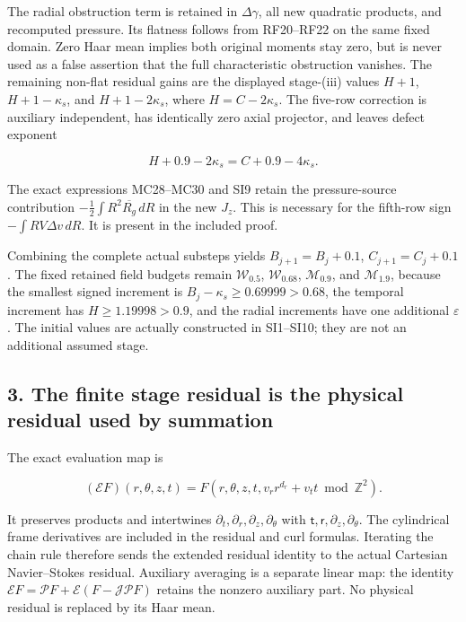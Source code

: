 \documentclass[10pt,a4paper]{article}
\begin{document}
The radial obstruction term is retained in \(\Delta\gamma\), all new quadratic products, and recomputed pressure. Its flatness follows from RF20--RF22 on the same fixed domain. Zero Haar mean implies both original moments stay zero, but is never used as a false assertion that the full characteristic obstruction vanishes. The remaining non-flat residual gains are the displayed stage-(iii) values \(H+1\), \(H+1-\kappa_s\), and \(H+1-2\kappa_s\), where \(H=C-2\kappa_s\). The five-row correction is auxiliary independent, has identically zero axial projector, and leaves defect exponent

\[
H+0.9-2\kappa_s=C+0.9-4\kappa_s.
\]

The exact expressions MC28--MC30 and SI9 retain the pressure-source contribution \(-\tfrac12\int R^2\overline{R_g}\,dR\) in the new \(J_z\). This is necessary for the fifth-row sign \(-\int RV\Delta v\,dR\). It is present in the included proof.

Combining the complete actual substeps yields \(B_{j+1}=B_j+0.1\), \(C_{j+1}=C_j+0.1\). The fixed retained field budgets remain \(\mathcal W_{0.5}\), \(\mathcal W_{0.68}\), \(\mathcal M_{0.9}\), and \(\mathcal M_{1.9}\), because the smallest signed increment is \(B_j-\kappa_s\ge0.69999>0.68\), the temporal increment has \(H\ge1.19998>0.9\), and the radial increments have one additional \(\varepsilon\). The initial values are actually constructed in SI1--SI10; they are not an additional assumed stage.

\subsection{3. The finite stage residual is the physical residual used by summation}\label{gclosure:the-finite-stage-residual-is-the-physical-residual-used-by-summation}

The exact evaluation map is

\[
(\mathcal EF)(r,\theta,z,t)=
F(r,\theta,z,t,v_rr^{d_r}+v_tt\bmod\mathbb Z^2).
\]

It preserves products and intertwines \(\partial_t,\partial_r,\partial_z,\partial_\theta\) with \(\mathsf t,\mathsf r,\partial_z,\partial_\theta\). The cylindrical frame derivatives are included in the residual and curl formulas. Iterating the chain rule therefore sends the extended residual identity to the actual Cartesian Navier--Stokes residual. Auxiliary averaging is a separate linear map: the identity \(\mathcal EF=\mathcal PF+\mathcal E(F-\mathcal J\mathcal PF)\) retains the nonzero auxiliary part. No physical residual is replaced by its Haar mean.
\end{document}
